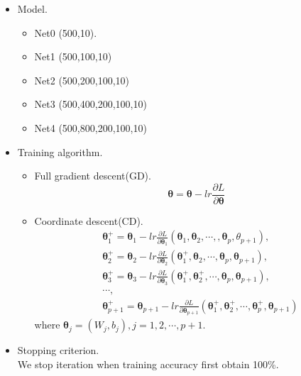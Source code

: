 \begin{itemize}
	\item Model.\\
    \begin{itemize}
    	\item Net0 (500,10).
    	\item Net1 (500,100,10)
    	\item Net2 (500,200,100,10)
    	\item Net3 (500,400,200,100,10)
    	\item Net4 (500,800,200,100,10)
    \end{itemize}
    \item Training algorithm.
    \begin{itemize}
    	\item Full gradient descent(GD).
    	    \begin{equation}
    	    	\bm\theta = \bm\theta - lr \frac{\partial L}{\partial \bm\theta}
    	    \end{equation} 
    	\item Coordinate descent(CD).
    	\begin{align}
    		&\bm\theta_1^+ = \bm\theta_1 - lr \frac{\partial L}{\partial \bm\theta_1}(\bm\theta_1,\bm\theta_2,\cdots,\bm,\bm\theta_p,\theta_{p+1}),\\
    		&\bm\theta_2^+ = \bm\theta_2 - lr \frac{\partial L}{\partial \bm\theta_2}(\bm\theta_1^+,\bm\theta_2,\cdots,\bm\theta_p,\bm\theta_{p+1}),\\
    		&\bm\theta_3^+ = \bm\theta_3 - lr \frac{\partial L}{\partial \bm\theta_3}(\bm\theta_1^+, \bm\theta_2^+,\cdots,\bm\theta_p,\bm\theta_{p+1}),\\
    		&\cdots,\\
    		&\bm\theta_{p+1}^+ = \bm\theta_{p+1} - lr \frac{\partial L}{\partial \bm\theta_{p+1}}(\bm\theta_1^+, \bm\theta_2^+,\cdots,\bm\theta_p^+,\bm\theta_{p+1})
    	\end{align}
    	where $\bm\theta_j = (W_j,b_j), j = 1,2,\cdots,p+1$.
    \end{itemize}
    \item Stopping criterion.\\
    We stop iteration when training accuracy first obtain 100\%.
\end{itemize}



